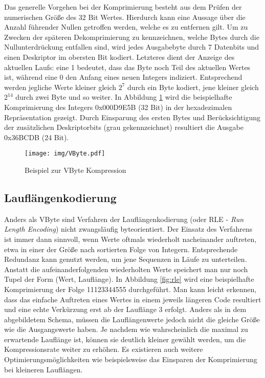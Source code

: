 Das generelle Vorgehen bei der Komprimierung besteht aus dem Prüfen der numerischen Größe des 32 Bit Wertes. Hierdurch kann eine Aussage über die Anzahl führender Nullen getroffen werden, welche es zu entfernen gilt. Um zu Zwecken der späteren Dekomprimierung zu kennzeichnen, welche Bytes durch die Nullunterdrückung entfallen sind, wird jedes Ausgabebyte durch 7 Datenbits und einen Deskriptor im obersten Bit kodiert. Letzteres dient der Anzeige des aktuellen Laufs: eine 1 bedeutet, dass das Byte noch Teil des aktuellen Wertes ist, während eine 0 den Anfang eines neuen Integers indiziert. Entsprechend werden jegliche Werte kleiner gleich $2^7$ durch ein Byte kodiert, jene kleiner gleich $2^{14}$ durch zwei Byte und so weiter. In Abbildung \ref{fig:vbyte} wird die beispielhafte Komprimierung des Integers 0x000D9E5B (32 Bit) in der hexadezimalen Repräsentation gezeigt. Durch Einsparung des ersten Bytes und Berücksichtigung der zusätzlichen Deskriptorbits (grau gekennzeichnet) resultiert die Ausgabe 0x36BCDB (24 Bit).

\begin{figure}
	\texttt{[image: img/VByte.pdf]}
	\centering
	\caption{Beispiel zur VByte Kompression}
	\label{fig:vbyte}
\end{figure}

\subsection{Lauflängenkodierung}

Anders als VByte sind Verfahren der Lauflängenkodierung (oder RLE - \textit{Run Length Encoding}) nicht zwangsläufig byteorientiert. Der Einsatz des Verfahrens ist immer dann sinnvoll, wenn Werte oftmals wiederholt nacheinander auftreten, etwa in einer der Größe nach sortierten Folge von Integern. Entsprechende Redundanz kann genutzt werden, um jene Sequenzen in Läufe zu unterteilen. Anstatt die aufeinanderfolgenden wiederholten Werte speichert man nur noch Tupel der Form (Wert, Lauflänge). In Abbildung \ref{fig:rle} wird eine beispielhafte Komprimierung der Folge 11123344555 durchgeführt. Man kann leicht erkennen, dass das einfache Auftreten eines Wertes in einem jeweils längeren Code resultiert und eine echte Verkürzung erst ab der Lauflänge 3 erfolgt. Anders als in dem abgebildetem Schema, müssen die Lauflängenwerte jedoch nicht die gleiche Größe wie die Ausgangswerte haben. Je nachdem wie wahrscheinlich die maximal zu erwartende Lauflänge ist, können sie deutlich kleiner gewählt werden, um die Kompressionsrate weiter zu erhöhen. Es existieren auch weitere Optimierungsmöglichkeiten wie beispielsweise das Einsparen der Komprimierung bei kleineren Lauflängen.

